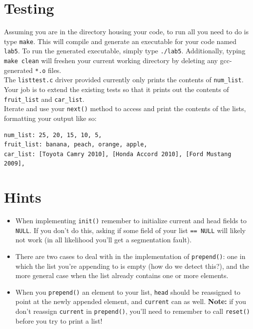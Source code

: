 \documentclass[12pt]{article}
\begin{document}
\section{Testing}

Assuming you are in the directory housing your code, to run all you need to do is type \texttt{make}. This will compile and generate an executable for your code named \texttt{lab5}. To run the generated executable, simply type \texttt{./lab5}. Additionally, typing \texttt{make clean} will freshen your current working directory by deleting any gcc-generated \texttt{*.o} files. \\

\noindent The \texttt{listtest.c} driver provided currently only prints the contents of \texttt{num\_list}. Your job is to extend the existing tests so that it prints out the contents of \texttt{fruit\_list} and \texttt{car\_list}. \\

\noindent Iterate and use your \texttt{next()} method to access and print the contents of the lists, formatting your output like so:

\begin{mdframed}[backgroundcolor=light-gray, innerleftmargin=10, innertopmargin=1,innerbottommargin=1,linecolor=light-gray]
\begin{lstlisting}
num_list: 25, 20, 15, 10, 5,
fruit_list: banana, peach, orange, apple,
car_list: [Toyota Camry 2010], [Honda Accord 2010], [Ford Mustang 2009],
\end{lstlisting}
\end{mdframed}

\section{Hints}

\begin{itemize}
\item When implementing \texttt{init()} remember to initialize current and head fields to \texttt{NULL}. If you don't do this, asking if some field of your list \texttt{== NULL} will likely not work (in all likelihood you'll get a segmentation fault).

\item There are two cases to deal with in the implementation of \texttt{prepend()}: one in which the list you're appending to is empty (how do we detect this?), and the more general case when the list already contains one or more elements.

\item When you \texttt{prepend()} an element to your list, \texttt{head} should be reassigned to point at the newly appended element, and \texttt{current} can as well. \textbf{Note:} if you don't reassign \texttt{current} in \texttt{prepend()},  you'll need to remember to call \texttt{reset()} before you try to print a list!
\end{itemize}
\end{document}
